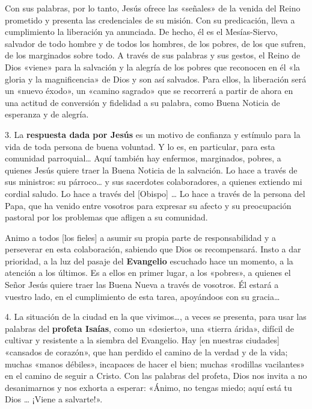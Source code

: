 \documentclass[]{article}
\begin{document}
Con sus palabras, por lo tanto, Jesús ofrece las «señales» de la venida
del Reino prometido y presenta las credenciales de su misión. Con su
predicación, lleva a cumplimiento la liberación ya anunciada. De hecho,
él es el Mesías-Siervo, salvador de todo hombre y de todos los hombres,
de los pobres, de los que sufren, de los marginados sobre todo. A través
de sus palabras y sus gestos, el Reino de Dios «viene» para la salvación
y la alegría de los pobres que reconocen en él «la gloria y la
magnificencia» de Dios y son así salvados. Para ellos, la liberación
será un «nuevo éxodo», un «camino sagrado» que se recorrerá a partir de
ahora en una actitud de conversión y fidelidad a su palabra, como Buena
Noticia de esperanza y de alegría.

3. La \textbf{respuesta dada por Jesús} es un motivo de confianza y
estímulo para la vida de toda persona de buena voluntad. Y lo es, en
particular, para esta comunidad parroquial\ldots{} Aquí también hay
enfermos, marginados, pobres, a quienes Jesús quiere traer la Buena
Noticia de la salvación. Lo hace a través de sus ministros: su
párroco\ldots{} y sus sacerdotes colaboradores, a quienes extiendo mi
cordial saludo. Lo hace a través del {[}Obispo{]} \ldots{} Lo hace a
través de la persona del Papa, que ha venido entre vosotros para
expresar su afecto y su preocupación pastoral por los problemas que
afligen a su comunidad.

Animo a todos {[}los fieles{]} a asumir su propia parte de
responsabilidad y a perseverar en esta colaboración, sabiendo que Dios
os recompensará. Insto a dar prioridad, a la luz del pasaje del
\textbf{Evangelio} escuchado hace un momento, a la atención a los
últimos. Es a ellos en primer lugar, a los «pobres», a quienes el Señor
Jesús quiere traer las Buena Nueva a través de vosotros. Él estará a
vuestro lado, en el cumplimiento de esta tarea, apoyándoos con su
gracia\ldots{}

4. La situación de la ciudad en la que vivimos\ldots{}, a veces se
presenta, para usar las palabras del \textbf{profeta Isaías}, como un
«desierto», una «tierra árida», difícil de cultivar y resistente a la
siembra del Evangelio. Hay {[}en nuestras ciudades{]} «cansados de
corazón», que han perdido el camino de la verdad y de la vida; muchas
«manos débiles», incapaces de hacer el bien; muchas «rodillas
vacilantes» en el camino de seguir a Cristo. Con las palabras del
profeta, Dios nos invita a no desanimarnos y nos exhorta a esperar:
«Ánimo, no tengas miedo; aquí está tu Dios \ldots{} ¡Viene a salvarte!».
\end{document}
